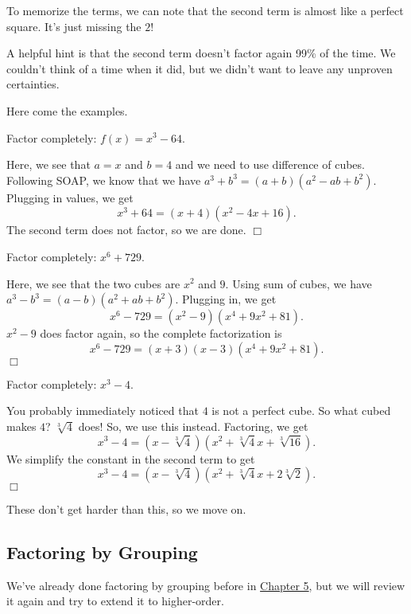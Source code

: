 \documentclass[lang=en,11pt]{elegantbook}
\begin{document}
To memorize the terms, we can note that the second term is almost like a perfect square.  It's just missing the $2$!

A helpful hint is that the second term doesn't factor again 99\% of the time.  We couldn't think of a time when it did, but we didn't want to leave any unproven certainties.

Here come the examples.
\begin{example}
Factor completely: $f(x)=x^3-64$.
\end{example}
\begin{solution}
Here, we see that $a=x$ and $b=4$ and we need to use difference of cubes.  Following SOAP, we know that we have $a^3+b^3=(a+b)(a^2-ab+b^2)$. Plugging in values, we get $$x^3+64=(x+4)(x^2-4x+16).$$ The second term does not factor, so we are done. $\Box$
\end{solution}
\begin{example}
Factor completely: $x^6+729$.
\end{example}
\begin{solution}
Here, we see that the two cubes are $x^2$ and $9$.  Using sum of cubes, we have $a^3-b^3=(a-b)(a^2+ab+b^2)$. Plugging in, we get $$x^6-729=(x^2-9)(x^4+9x^2+81).$$ $x^2-9$ does factor again, so the complete factorization is $$x^6-729=(x+3)(x-3)(x^4+9x^2+81).$$ $\Box$
\end{solution}
\begin{example}
Factor completely: $x^3-4$.
\end{example}
\begin{solution}
You probably immediately noticed that $4$ is not a perfect cube.  So what cubed makes $4$? $\sqrt[3]{4}$ does!  So, we use this instead. Factoring, we get $$x^3-4=(x-\sqrt[3]{4})(x^2+\sqrt[3]{4}x+\sqrt[3]{16}).$$ We simplify the constant in the second term to get $$x^3-4=(x-\sqrt[3]{4})(x^2+\sqrt[3]{4}x+2\sqrt[3]{2}).$$ $\Box$
\end{solution}
These don't get harder than this, so we move on.
\subsection{Factoring by Grouping}
\noindent We've already done factoring by grouping before in \hyperlink{chapter.5}{Chapter 5}, but we will review it again and try to extend it to higher-order.
\end{document}
